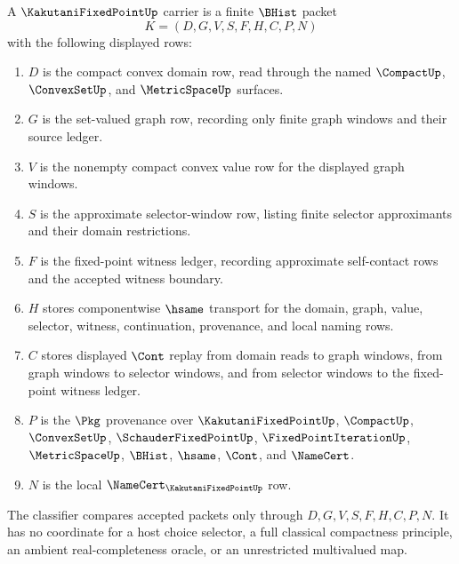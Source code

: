 \begin{definition}\label{def:kakutani-fixed-point-carrier}
A $\KakutaniFixedPointUp$ carrier is a finite $\BHist$ packet
$$
K=(D,G,V,S,F,H,C,P,N)
$$
with the following displayed rows:
\begin{enumerate}
\item $D$ is the compact convex domain row, read through the named $\CompactUp$, $\ConvexSetUp$, and $\MetricSpaceUp$ surfaces.
\item $G$ is the set-valued graph row, recording only finite graph windows and their source ledger.
\item $V$ is the nonempty compact convex value row for the displayed graph windows.
\item $S$ is the approximate selector-window row, listing finite selector approximants and their domain restrictions.
\item $F$ is the fixed-point witness ledger, recording approximate self-contact rows and the accepted witness boundary.
\item $H$ stores componentwise $\hsame$ transport for the domain, graph, value, selector, witness, continuation, provenance, and local naming rows.
\item $C$ stores displayed $\Cont$ replay from domain reads to graph windows, from graph windows to selector windows, and from selector windows to the fixed-point witness ledger.
\item $P$ is the $\Pkg$ provenance over $\KakutaniFixedPointUp$, $\CompactUp$, $\ConvexSetUp$, $\SchauderFixedPointUp$, $\FixedPointIterationUp$, $\MetricSpaceUp$, $\BHist$, $\hsame$, $\Cont$, and $\NameCert$.
\item $N$ is the local $\NameCert_{\KakutaniFixedPointUp}$ row.
\end{enumerate}
The classifier compares accepted packets only through $D,G,V,S,F,H,C,P,N$. It has no coordinate for a host choice selector, a full classical compactness principle, an ambient real-completeness oracle, or an unrestricted multivalued map.
\end{definition}

